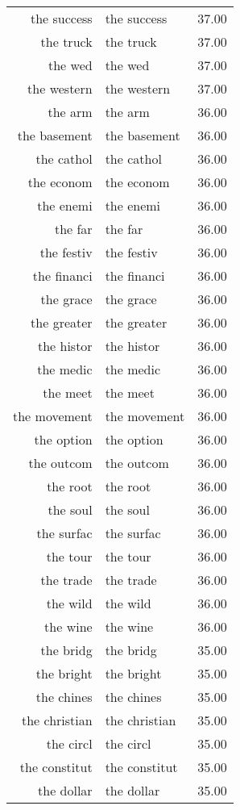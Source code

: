 \begin{table}[ht]
\begin{tabular}{rlr}
  the success & the success & 37.00 \\ 
  the truck & the truck & 37.00 \\ 
  the wed & the wed & 37.00 \\ 
  the western & the western & 37.00 \\ 
  the arm & the arm & 36.00 \\ 
  the basement & the basement & 36.00 \\ 
  the cathol & the cathol & 36.00 \\ 
  the econom & the econom & 36.00 \\ 
  the enemi & the enemi & 36.00 \\ 
  the far & the far & 36.00 \\ 
  the festiv & the festiv & 36.00 \\ 
  the financi & the financi & 36.00 \\ 
  the grace & the grace & 36.00 \\ 
  the greater & the greater & 36.00 \\ 
  the histor & the histor & 36.00 \\ 
  the medic & the medic & 36.00 \\ 
  the meet & the meet & 36.00 \\ 
  the movement & the movement & 36.00 \\ 
  the option & the option & 36.00 \\ 
  the outcom & the outcom & 36.00 \\ 
  the root & the root & 36.00 \\ 
  the soul & the soul & 36.00 \\ 
  the surfac & the surfac & 36.00 \\ 
  the tour & the tour & 36.00 \\ 
  the trade & the trade & 36.00 \\ 
  the wild & the wild & 36.00 \\ 
  the wine & the wine & 36.00 \\ 
  the bridg & the bridg & 35.00 \\ 
  the bright & the bright & 35.00 \\ 
  the chines & the chines & 35.00 \\ 
  the christian & the christian & 35.00 \\ 
  the circl & the circl & 35.00 \\ 
  the constitut & the constitut & 35.00 \\ 
  the dollar & the dollar & 35.00 \\ 

\end{tabular}
\end{table}
